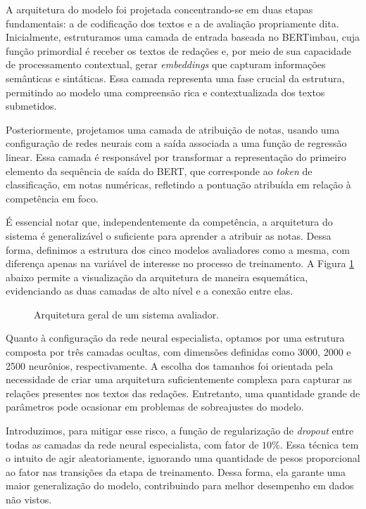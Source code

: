 A arquitetura do modelo foi projetada concentrando-se em duas etapas fundamentais: a de codificação dos textos e a de avaliação propriamente dita. Inicialmente, estruturamos uma camada de entrada baseada no BERTimbau, cuja função primordial é receber os textos de redações e, por meio de sua capacidade de processamento contextual, gerar \textit{embeddings} que capturam informações semânticas e sintáticas. Essa camada representa uma fase crucial da estrutura, permitindo ao modelo uma compreensão rica e contextualizada dos textos submetidos.

Posteriormente, projetamos uma camada de atribuição de notas, usando uma configuração de redes neurais com a saída associada a uma função de regressão linear. Essa camada é responsável por transformar a representação do primeiro elemento da sequência de saída do BERT, que corresponde ao \textit{token} de classificação, em notas numéricas, refletindo a pontuação atribuída em relação à competência em foco.

É essencial notar que, independentemente da competência, a arquitetura do sistema é generalizável o suficiente para aprender a atribuir as notas. Dessa forma, definimos a estrutura dos cinco modelos avaliadores como a mesma, com diferença apenas na variável de interesse no processo de treinamento. A Figura \ref{fig:full_architecture} abaixo permite a visualização da arquitetura de maneira esquemática, evidenciando as duas camadas de alto nível e a conexão entre elas.

\begin{figure}[H]
    \caption{Arquitetura geral de um sistema avaliador.}
    \label{fig:full_architecture}
    \centering
    \resizebox{\textwidth}{!}{}
\end{figure}

Quanto à configuração da rede neural especialista, optamos por uma estrutura composta por três camadas ocultas, com dimensões definidas como 3000, 2000 e 2500 neurônios, respectivamente. A escolha dos tamanhos foi orientada pela necessidade de criar uma arquitetura suficientemente complexa para capturar as relações presentes nos textos das redações. Entretanto, uma quantidade grande de parâmetros pode ocasionar em problemas de sobreajustes do modelo.

Introduzimos, para mitigar esse risco, a função de regularização de \textit{dropout} entre todas as camadas da rede neural especialista, com fator de $10\%$. Essa técnica tem o intuito de agir aleatoriamente, ignorando uma quantidade de pesos proporcional ao fator nas transições da etapa de treinamento. Dessa forma, ela garante uma maior generalização do modelo, contribuindo para melhor desempenho em dados não vistos.

